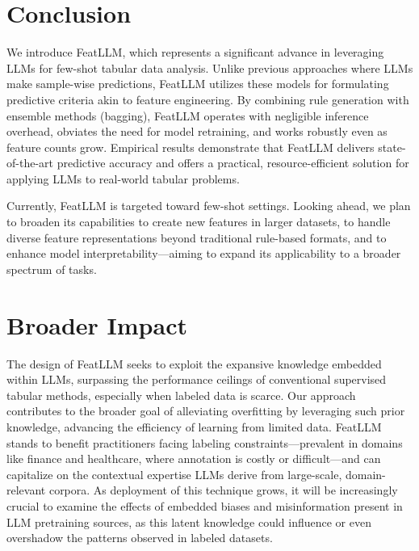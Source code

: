 \section{Conclusion}
We introduce \textsf{FeatLLM}, which represents a significant advance in leveraging LLMs for few-shot tabular data analysis. Unlike previous approaches where LLMs make sample-wise predictions, \textsf{FeatLLM} utilizes these models for formulating predictive criteria akin to feature engineering. By combining rule generation with ensemble methods (bagging), \textsf{FeatLLM} operates with negligible inference overhead, obviates the need for model retraining, and works robustly even as feature counts grow. Empirical results demonstrate that \textsf{FeatLLM} delivers state-of-the-art predictive accuracy and offers a practical, resource-efficient solution for applying LLMs to real-world tabular problems.

Currently, \textsf{FeatLLM} is targeted toward few-shot settings. Looking ahead, we plan to broaden its capabilities to create new features in larger datasets, to handle diverse feature representations beyond traditional rule-based formats, and to enhance model interpretability—aiming to expand its applicability to a broader spectrum of tasks.

\section{Broader Impact}
The design of \textsf{FeatLLM} seeks to exploit the expansive knowledge embedded within LLMs, surpassing the performance ceilings of conventional supervised tabular methods, especially when labeled data is scarce. Our approach contributes to the broader goal of alleviating overfitting by leveraging such prior knowledge, advancing the efficiency of learning from limited data. \textsf{FeatLLM} stands to benefit practitioners facing labeling constraints—prevalent in domains like finance and healthcare, where annotation is costly or difficult—and can capitalize on the contextual expertise LLMs derive from large-scale, domain-relevant corpora. As deployment of this technique grows, it will be increasingly crucial to examine the effects of embedded biases and misinformation present in LLM pretraining sources, as this latent knowledge could influence or even overshadow the patterns observed in labeled datasets.

